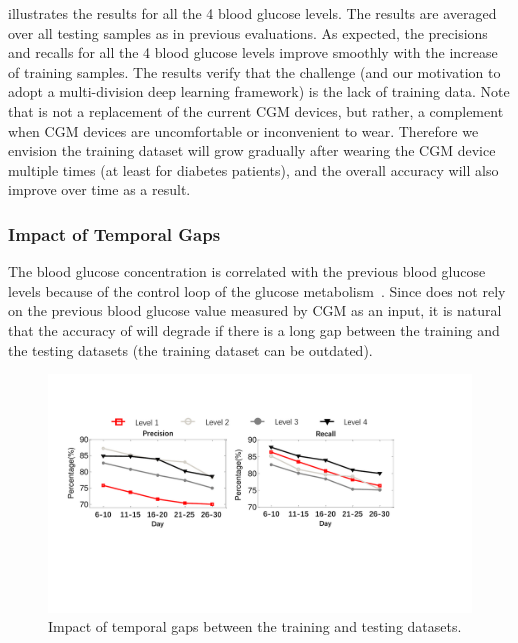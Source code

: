  illustrates the results for all the 4 blood glucose levels.
The results are averaged over all testing samples as in previous evaluations.
As expected, the precisions and recalls for all the 4 blood glucose levels improve smoothly with the increase of training samples.
The results verify that the challenge (and our motivation to adopt a multi-division deep learning framework) is the lack of training data.
Note that \sysname is not a replacement of the current CGM devices, but rather, a complement when CGM devices are uncomfortable or inconvenient to wear.
Therefore we envision the training dataset will grow gradually after wearing the CGM device multiple times (at least for diabetes patients), and the overall accuracy will also improve over time as a result.



\subsubsection{Impact of Temporal Gaps}
The blood glucose concentration is correlated with the previous blood glucose levels because of the control loop of the glucose metabolism~\cite{bib:TBE07:Dalla, bib:PE04:Hovorka, bib:IJNMBE16:Oviedo}.
Since \sysname does not rely on the previous blood glucose value measured by CGM as an input, it is natural that the accuracy of \sysname will degrade if there is a long gap between the training and the testing datasets (\ie the training dataset can be outdated).

\begin{figure}[h]
  \centering
  \includegraphics[width=0.9\columnwidth]{./img/Performance_gap1.pdf}
  \caption{Impact of temporal gaps between the training and testing datasets.}
  \label{fig:per_under_various_pred_days}
\end{figure}

